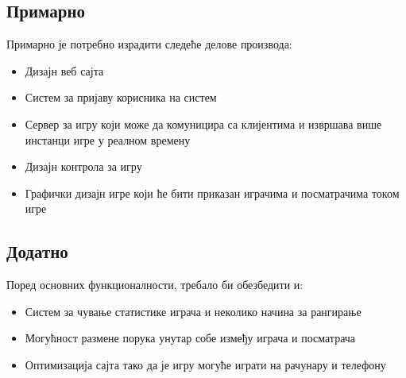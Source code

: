 \subsection{Примарно}
Примарно је потребно израдити следеће делове производа:
\begin{itemize}

\item Дизајн веб сајта

\item Систем за пријаву корисника на систем

\item Сервер за игру који може да комуницира са клијентима и извршава више инстанци игре у реалном времену

\item Дизајн контрола за игру

\item Графички дизајн игре који ће бити приказан играчима и посматрачима током игре

\end{itemize}

\subsection{Додатно}
Поред основних функционалности, требало би обезбедити и:
\begin{itemize}
    
    \item Систем за чување статистике играча и неколико начина за рангирање

    \item Могућност размене порука унутар собе између играча и посматрача

\item Оптимизација сајта тако да је игру могуће играти на рачунару и телефону    
\end{itemize}
